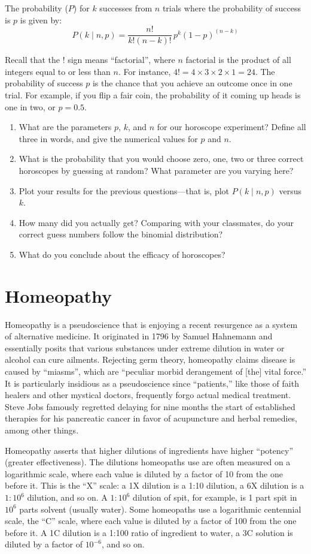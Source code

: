 \documentclass[11pt]{article}
\begin{document}
The probability ($P$) for $k$ successes from $n$ trials where the probability of success is $p$ is given by:
\[
P(k \mid n,p) = \frac{n!}{k!(n-k)!} \, p^k (1-p)^{(n-k)}
\]

Recall that the $!$ sign means ``factorial'', where $n$ factorial is the product of all integers equal to or less than $n$. For instance, $4! = 4 \times 3 \times 2 \times 1 = 24$. The probability of success $p$ is the chance that you achieve an outcome once in one trial. For example, if you flip a fair coin, the probability of it coming up heads is one in two, or $p=0.5$.

\begin{enumerate}
    \item What are the parameters $p$, $k$, and $n$ for our horoscope experiment? Define all three in words, and give the numerical values for $p$ and $n$.
    \item What is the probability that you would choose zero, one, two or three correct horoscopes by guessing at random? What parameter are you varying here?
    \item Plot your results for the previous questions---that is, plot $P(k \mid n,p)$ versus $k$.
    \item How many did you actually get? Comparing with your classmates, do your correct guess numbers follow the binomial distribution?
    \item What do you conclude about the efficacy of horoscopes?
\end{enumerate}

\section{Homeopathy}
Homeopathy is a pseudoscience that is enjoying a recent resurgence as a system of alternative medicine. It originated in 1796 by Samuel Hahnemann and essentially posits that various substances under extreme dilution in water or alcohol can cure ailments. Rejecting germ theory, homeopathy claims disease is caused by ``miasms'', which are ``peculiar morbid derangement of [the] vital force.'' It is particularly insidious as a pseudoscience since ``patients,'' like those of faith healers and other mystical doctors, frequently forgo actual medical treatment. Steve Jobs famously regretted delaying for nine months the start of established therapies for his pancreatic cancer in favor of acupuncture and herbal remedies, among other things.

Homeopathy asserts that higher dilutions of ingredients have higher ``potency'' (greater effectiveness). The dilutions homeopaths use are often measured on a logarithmic scale, where each value is diluted by a factor of 10 from the one before it. This is the ``X'' scale: a 1X dilution is a 1:10 dilution, a 6X dilution is a $1:10^6$ dilution, and so on. A $1:10^6$ dilution of spit, for example, is 1 part spit in $10^6$ parts solvent (usually water). Some homeopaths use a logarithmic centennial scale, the ``C'' scale, where each value is diluted by a factor of 100 from the one before it. A 1C dilution is a 1:100 ratio of ingredient to water, a 3C solution is diluted by a factor of $10^{-6}$, and so on.
\end{document}
